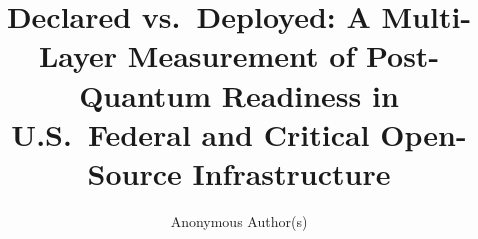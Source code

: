 \documentclass[10pt,sigconf,letterpaper,anonymous,nonacm]{acmart}
\begin{document}
\title{Declared vs.\ Deployed: A Multi-Layer Measurement of Post-Quantum
Readiness in U.S.\ Federal and Critical Open-Source Infrastructure}
\author{Anonymous Author(s)}


\maketitle






\appendix

\end{document}
